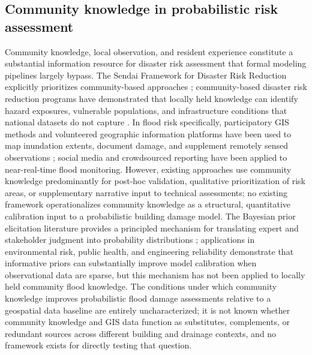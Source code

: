 \documentclass[11pt]{article}
\begin{document}
\subsection{Community knowledge in probabilistic risk assessment}
Community knowledge, local observation, and resident experience constitute a
substantial information resource for disaster risk assessment that formal modeling
pipelines largely bypass.
The Sendai Framework for Disaster Risk Reduction explicitly prioritizes
community-based approaches \cite{undrr2015sendai}; community-based disaster risk reduction programs have
demonstrated that locally held knowledge can identify hazard exposures, vulnerable
populations, and infrastructure conditions that national datasets do not capture
\cite{twigg2015disaster}.
In flood risk specifically, participatory GIS methods and volunteered geographic
information platforms have been used to map inundation extents, document damage,
and supplement remotely sensed observations \cite{goodchild2007citizens,assumpcao2018citizen}; social media and crowdsourced reporting
have been applied to near-real-time flood monitoring.
However, existing approaches use community knowledge predominantly for post-hoc
validation, qualitative prioritization of risk areas, or supplementary narrative
input to technical assessments; no existing framework operationalizes community
knowledge as a structural, quantitative calibration input to a probabilistic
building damage model.
The Bayesian prior elicitation literature provides a principled mechanism for
translating expert and stakeholder judgment into probability distributions
\cite{ohagan2006uncertain,garthwaite2005statistical};
applications in environmental risk, public health, and engineering reliability
demonstrate that informative priors can substantially improve model calibration
when observational data are sparse, but this mechanism has not been applied to
locally held community flood knowledge.
The conditions under which community knowledge improves probabilistic flood damage
assessments relative to a geospatial data baseline are entirely uncharacterized;
it is not known whether community knowledge and GIS data function as substitutes,
complements, or redundant sources across different building and drainage contexts,
and no framework exists for directly testing that question.
\end{document}

